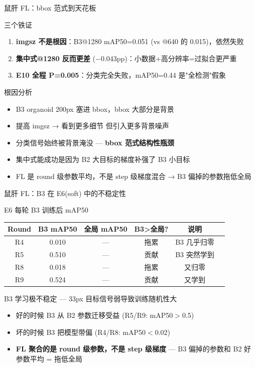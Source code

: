 \documentclass[aspectratio=169, 10pt]{beamer}
\begin{document}
\begin{frame}{鼠肝 FL：bbox 范式到天花板}
  \begin{alertblock}{三个铁证}
    \begin{enumerate}
      \item \textbf{imgsz 不是根因}：B3@1280 mAP50=0.051 (vs @640 的 0.015)，依然失败
      \item \textbf{集中式@1280 反而更差} ($-$0.043pp)：小数据+高分辨率=过拟合更严重
      \item \textbf{E10 全程 P=0.005}：分类完全失败，mAP50=0.44 是"全检测"假象
    \end{enumerate}
  \end{alertblock}
  \vspace{0em}
  \begin{block}{根因分析}
    \begin{itemize}
      \item B3 organoid 200px 塞进 bbox，bbox 大部分是背景
      \item 提高 imgsz → 看到更多细节 \alert{但引入更多背景噪声}
      \item 分类信号始终被背景淹没 — \textbf{bbox 范式结构性瓶颈}
      \item 集中式能成功是因为 B2 大目标的梯度补强了 B3 小目标
      \item FL 是 round 级参数平均，不是 step 级梯度混合 → B3 偏掉的参数拖低全局
    \end{itemize}
  \end{block}
\end{frame}

\begin{frame}{鼠肝 FL：B3 在 E6(soft) 中的不稳定性}
  \begin{block}{E6 每轮 B3 训练后 mAP50}
    \begin{tabular}{cccccc}
      \toprule
      \textbf{Round} & \textbf{B3 mAP50} & \textbf{全局 mAP50} & \textbf{B3>全局?} & \textbf{说明} \\
      \midrule
      R4 & 0.010 & — & \alert{拖累} & B3 几乎归零 \\
      R5 & 0.510 & — & 贡献 & B3 突然学到 \\
      R8 & 0.018 & — & \alert{拖累} & 又归零 \\
      R9 & 0.524 & — & 贡献 & 又学到 \\
      \bottomrule
    \end{tabular}
  \end{block}
  \vspace{0em}
  \begin{alertblock}{B3 学习极不稳定 — 33px 目标信号弱导致训练随机性大}
    \begin{itemize}
      \item 好的时候 B3 从 B2 参数迁移受益 (R5/R9: mAP50$>$0.5)
      \item 坏的时候 B3 把模型带偏 (R4/R8: mAP50$<$0.02)
      \item \textbf{FL 聚合的是 round 级参数，不是 step 级梯度} — B3 偏掉的参数和 B2 好参数平均 = 拖低全局
    \end{itemize}
  \end{alertblock}
\end{frame}
\end{document}
